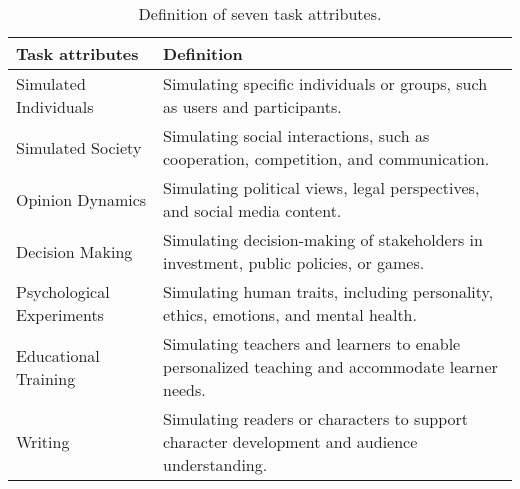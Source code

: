 \begin{table*}[ht]
\small
\caption{Definition of seven task attributes.}
\begin{tabular}{@{}ll@{}}
\toprule
\textbf{Task attributes}         & \textbf{Definition}                                                                                  \\ \midrule
Simulated Individuals    & Simulating specific individuals or groups, such as users and participants.                                                                                                  \\ 
Simulated Society        & Simulating social interactions, such as cooperation, competition, and communication. \\ 
Opinion Dynamics         & Simulating political views, legal perspectives, and social media content.                                                                                                                  \\ 
Decision Making          & Simulating decision-making of stakeholders in investment, public policies, or games.                                                                                            \\ 
Psychological Experiments & Simulating human traits, including personality, ethics, emotions, and mental health.                                                                                                                             \\ 
Educational Training     & Simulating teachers and learners to enable personalized teaching and accommodate learner needs.                      \\ 
Writing                  & Simulating readers or characters to support character development and audience understanding.                             \\  \bottomrule
\end{tabular}
\label{task_def}
\end{table*}

